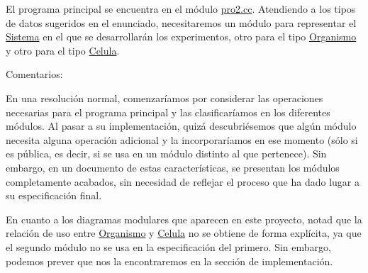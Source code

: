 \-El programa principal se encuentra en el módulo \hyperlink{pro2_8cc}{pro2.\-cc}. \-Atendiendo a los tipos de datos sugeridos en el enunciado, necesitaremos un módulo para representar el \hyperlink{class_sistema}{\-Sistema} en el que se desarrollarán los experimentos, otro para el tipo \hyperlink{class_organismo}{\-Organismo} y otro para el tipo \hyperlink{class_celula}{\-Celula}.

\-Comentarios\-:


\begin{DoxyItemize}
\item \-En una resolución normal, comenzaríamos por considerar las operaciones necesarias para el programa principal y las clasificaríamos en los diferentes módulos. \-Al pasar a su implementación, quizá descubriésemos que algún módulo necesita alguna operación adicional y la incorporaríamos en ese momento (sólo si es pública, es decir, si se usa en un módulo distinto al que pertenece). \-Sin embargo, en un documento de estas características, se presentan los módulos completamente acabados, sin necesidad de reflejar el proceso que ha dado lugar a su especificación final.
\end{DoxyItemize}


\begin{DoxyItemize}
\item \-En cuanto a los diagramas modulares que aparecen en este proyecto, notad que la relación de uso entre \hyperlink{class_organismo}{\-Organismo} y \hyperlink{class_celula}{\-Celula} no se obtiene de forma explícita, ya que el segundo módulo no se usa en la especificación del primero. \-Sin embargo, podemos prever que nos la encontraremos en la sección de implementación. 
\end{DoxyItemize}